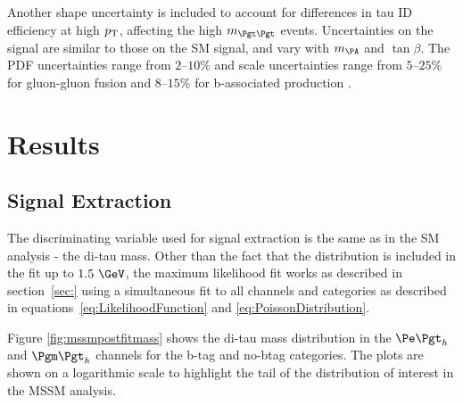 Another shape uncertainty is included to account for differences in tau ID
efficiency at high $p_{\mathrm{T}}$, affecting the high $m_{\Pgt\Pgt}$ events. 
Uncertainties on the signal are similar to those on the \ac{SM} signal, and vary
with $m_{\PA}$ and $\tan\beta$. The \ac{PDF} uncertainties range from $2$--$10\%$ and scale uncertainties range from
$5$--$25\%$ for gluon-gluon fusion and $8$--$15\%$ for b-associated production
\cite{CMS-PAS-HIG-13-021}.

\section{Results}
\label{sec:mssmResults}

\subsection{Signal Extraction}
\label{sec:mssmSignalExtraction}

The discriminating variable used for signal extraction is the same as in the
\ac{SM} analysis - the di-tau mass. Other than the fact that the distribution is
included in the fit up to $1.5~\GeV$, the maximum likelihood fit works as
described in section~\ref{sec:} using a simultaneous fit to all channels and
categories as described in equations~\ref{eq:LikelihoodFunction} and
\ref{eq:PoissonDistribution}.

Figure \ref{fig:mssmpostfitmass} shows the di-tau mass distribution in the
$\etau$ and $\mutau$ channels for the b-tag and no-btag categories. The plots
are shown on a logarithmic scale to highlight the tail of the distribution of
interest in the \ac{MSSM} analysis. 

